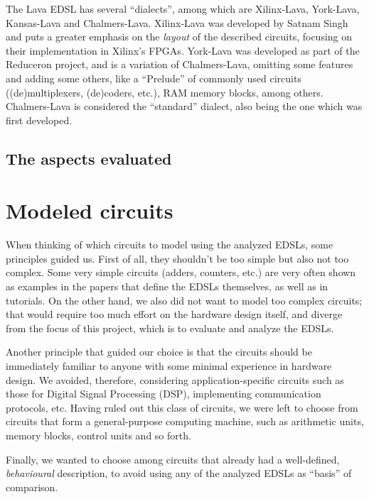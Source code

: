 \documentclass[a4paper]{article}
\begin{document}
            The Lava EDSL has several ``dialects'', among which are Xilinx-Lava, York-Lava,
            Kansas-Lava and Chalmers-Lava. Xilinx-Lava was developed by Satnam Singh and puts a
            greater emphasis on the \emph{layout} of the described circuits, focusing on their
            implementation in Xilinx's FPGAs. York-Lava was developed as part of the Reduceron
            project, and is a variation of Chalmers-Lava, omitting some features and adding some
            others, like a ``Prelude'' of commonly used circuits ((de)multiplexers, (de)coders,
            etc.), RAM memory blocks, among others. Chalmers-Lava is considered the ``standard''
            dialect, also being the one which was first developed.


        \subsection{The aspects evaluated}
        \label{subsec:aspects}


    \section{Modeled circuits}
    \label{sec:circuits}
        When thinking of which circuits to model using the analyzed EDSLs, some principles guided
        us. First of all, they shouldn't be too simple but also not too complex. Some very simple
        circuits (adders, counters, etc.) are very often shown as examples in the papers that define
        the EDSLs themselves, as well as in tutorials. On the other hand, we also did not want to
        model too complex circuits; that would require too much effort on the hardware design
        itself, and diverge from the focus of this project, which is to evaluate and analyze the
        EDSLs.

        Another principle that guided our choice is that the circuits should be immediately familiar
        to anyone with some minimal experience in hardware design. We avoided, therefore,
        considering application-specific circuits such as those for Digital Signal Processing (DSP),
        implementing communication protocols, etc. Having ruled out this class of circuits, we were
        left to choose from circuits that form a general-purpose computing machine, such as
        arithmetic units, memory blocks, control units and so forth.

        Finally, we wanted to choose among circuits that already had a well-defined,
        \emph{behavioural} description, to avoid using any of the analyzed EDSLs as ``basis'' of
        comparison.
\end{document}
